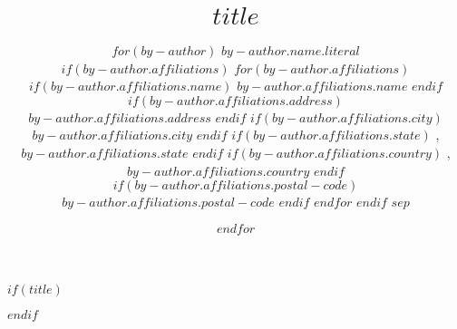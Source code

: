 
\date{}

$if(title)$
\title{{\Large \bf $title$}}
$endif$

\author{
$for(by-author)$
  {\rm $by-author.name.literal$} \\
  $if(by-author.affiliations)$
    $for(by-author.affiliations)$
        $if(by-author.affiliations.name)$
          $by-author.affiliations.name$
        $endif$
        $if(by-author.affiliations.address)$
          \\ $by-author.affiliations.address$
        $endif$
        $if(by-author.affiliations.city)$
          \\ $by-author.affiliations.city$
        $endif$
        $if(by-author.affiliations.state)$
          , $by-author.affiliations.state$
        $endif$
        $if(by-author.affiliations.country)$
          , $by-author.affiliations.country$
        $endif$
        $if(by-author.affiliations.postal-code)$
          $by-author.affiliations.postal-code$
        $endif$
    $endfor$
  $endif$
$sep$
\and
$endfor$
}
